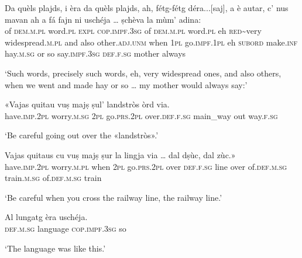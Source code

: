 \begin{linenumbers}
\gll    Da quèls plajds\footnotemark, i èra da quèls plajds, ah, fétg-fétg déra...[saj], a è autar, c' nus mavan ah a fá fajn ni uschéja … ṣchèva la mùm’ adina:\\
of \textsc{dem.m.pl} word.\textsc{pl} \textsc{expl} \textsc{cop.impf.3sg} of \textsc{dem.m.pl} word.\textsc{pl} eh \textsc{red}\textasciitilde{very} widespread.\textsc{m.pl} and also other.\textsc{adj.unm} when \textsc{1pl} go.\textsc{impf.1pl} eh \textsc{subord} make.\textsc{inf} hay.\textsc{m.sg} or so {} say.\textsc{impf.3sg} \textsc{def.f.sg} mother always\\
\end{linenumbers}
\medskip
\glt `Such words, precisely such words, eh, very widespread ones, and also others, when we went and made hay or so … my mother would always say:'
\medskip

\begin{linenumbers}
\gll   «Vajas quitau vuṣ majṣ ṣul' landstròs òrd via. \\
have.\textsc{imp.2pl} worry.\textsc{m.sg} \textsc{2pl} go.\textsc{prs.2pl}  over.\textsc{def.f.sg} main\_way out way.\textsc{f.sg} \\
\end{linenumbers}
\medskip
\glt `Be careful going out over the «landstròs».'
\medskip

\begin{linenumbers}
\gll    Vajas quitaus cu vuṣ majṣ ṣur la lingja via …\footnotemark{} dal dṣùc, dal zùc\footnotemark.»\\
have.\textsc{imp.2pl} worry.\textsc{m.pl} when \textsc{2pl} go.\textsc{prs.2pl} over \textsc{def.f.sg} line over {} of.\textsc{def.m.sg} train.\textsc{m.sg} of.\textsc{def.m.sg} train\\
\end{linenumbers}
\medskip
\glt `Be careful when you cross the railway line, the railway line.' 
\medskip

\begin{linenumbers}
\gll    Al lungatg èra uschéja.\\
 \textsc{def.m.sg} language \textsc{cop.impf.3sg} so\\
\end{linenumbers}
\medskip
\glt `The language was like this.'
\medskip

